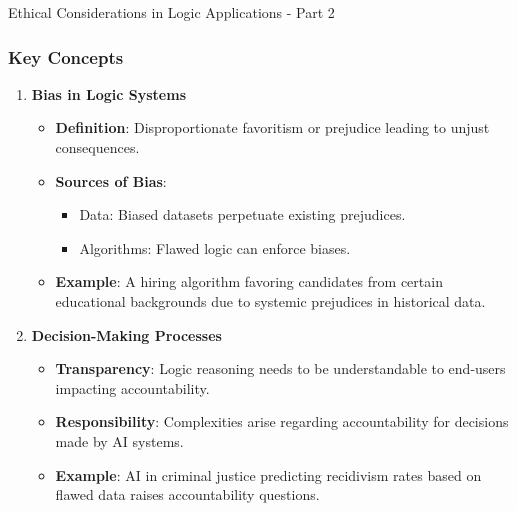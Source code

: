 \documentclass[aspectratio=169]{beamer}
\begin{document}
\begin{frame}[fragile]{Ethical Considerations in Logic Applications - Part 2}
    \frametitle{Key Concepts}
    \begin{enumerate}
        \item \textbf{Bias in Logic Systems}
        \begin{itemize}
            \item \textbf{Definition}: Disproportionate favoritism or prejudice leading to unjust consequences.
            \item \textbf{Sources of Bias}:
            \begin{itemize}
                \item Data: Biased datasets perpetuate existing prejudices.
                \item Algorithms: Flawed logic can enforce biases.
            \end{itemize}
            \item \textbf{Example}: A hiring algorithm favoring candidates from certain educational backgrounds due to systemic prejudices in historical data.
        \end{itemize}
        
        \item \textbf{Decision-Making Processes}
        \begin{itemize}
            \item \textbf{Transparency}: Logic reasoning needs to be understandable to end-users impacting accountability.
            \item \textbf{Responsibility}: Complexities arise regarding accountability for decisions made by AI systems.
            \item \textbf{Example}: AI in criminal justice predicting recidivism rates based on flawed data raises accountability questions.
        \end{itemize}
    \end{enumerate}
\end{frame}
\end{document}
